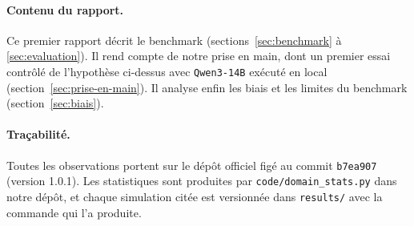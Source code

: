 \paragraph{Contenu du rapport.} Ce premier rapport décrit le benchmark (sections~\ref{sec:benchmark} à \ref{sec:evaluation}). Il rend compte de notre prise en main, dont un premier essai contrôlé de l'hypothèse ci-dessus avec \texttt{Qwen3-14B} exécuté en local (section~\ref{sec:prise-en-main}). Il analyse enfin les biais et les limites du benchmark (section~\ref{sec:biais}).

\paragraph{Traçabilité.} Toutes les observations portent sur le dépôt officiel \cite{tau2repo} figé au commit \texttt{b7ea907} (version 1.0.1). Les statistiques sont produites par \texttt{code/domain\_stats.py} dans notre dépôt, et chaque simulation citée est versionnée dans \texttt{results/} avec la commande qui l'a produite.
